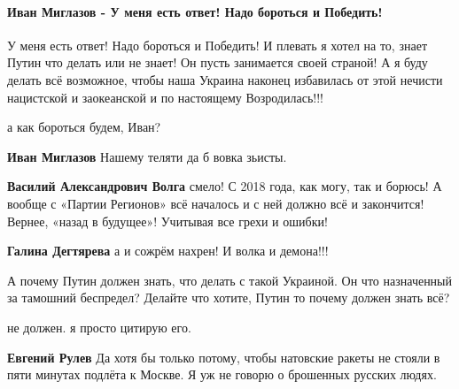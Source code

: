  
 
 
 
 
\paragraph{Иван Миглазов - У меня есть ответ! Надо бороться и Победить!}
\label{sec:25_10_2021.fb.volga_vasilii.1.rasterjannost.cmt.miglazov.otvet}

\begin{itemize} %


У меня есть ответ! Надо бороться и Победить! И плевать я хотел на то, знает
Путин что делать или не знает! Он пусть занимается своей страной! А я буду
делать всё возможное, чтобы наша Украина наконец избавилась от этой нечисти
нацистской и заокеанской и по настоящему Возродилась!!!

\begin{itemize} %
а как бороться будем, Иван?

\textbf{Иван Миглазов} Нашему теляти да б вовка зьисты.

\textbf{Василий Александрович Волга} смело! С 2018 года, как могу, так и борюсь! А вообще с «Партии Регионов» всё началось и с ней должно всё и закончится! Вернее, «назад в будущее»! Учитывая все грехи и ошибки!

\textbf{Галина Дегтярева} а и сожрём нахрен! И волка и демона!!!
\end{itemize} %


А почему Путин должен знать, что делать с такой Украиной. Он что назначенный за
тамошний беспредел? Делайте что хотите, Путин то почему должен знать всё?

\begin{itemize} %
не должен. я просто цитирую его.

\textbf{Евгений Рулев} Да хотя бы только потому, чтобы натовские ракеты не
стояли в пяти минутах подлёта к Москве. Я уж не говорю о брошенных русских
людях.
\end{itemize} %


\end{itemize}
